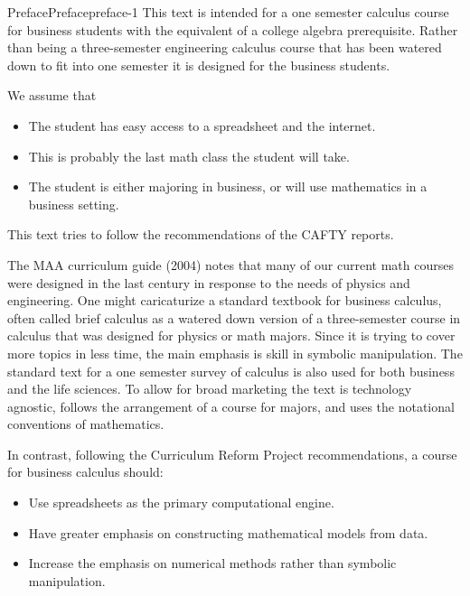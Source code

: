 \documentclass[oneside,10pt,]{book}
\numberwithin{equation}{section}
\begin{document}
\begin{preface}{Preface}{}{Preface}{}{}{preface-1}
\hypertarget{p-4}{}%
This text is intended for a one semester calculus course for business students with the equivalent of a college algebra prerequisite.  Rather than being a three-semester engineering calculus course that has been watered down to fit into one semester it is designed for the business students.%
\par
\hypertarget{p-5}{}%
We assume that%
\leavevmode%
\begin{itemize}[label=\textbullet]
\item{}\hypertarget{p-6}{}%
The student has easy access to a spreadsheet and the internet.%
\item{}\hypertarget{p-7}{}%
This is probably the last math class the student will take.%
\item{}\hypertarget{p-8}{}%
The student is either majoring in business, or will use mathematics in a business setting.%
\end{itemize}
\hypertarget{p-9}{}%
This text tries to follow the recommendations of the CAFTY reports.%
\par
\hypertarget{p-10}{}%
The MAA curriculum guide (2004) notes that many of our current math courses were designed in the last century in response to the needs of physics and engineering. One might caricaturize a standard textbook for business calculus, often called brief calculus as a watered down version of a three-semester course in calculus that was designed for physics or math majors. Since it is trying to cover more topics in less time, the main emphasis is skill in symbolic manipulation. The standard text for a one semester survey of calculus is also used for both business and the life sciences. To allow for broad marketing the text is technology agnostic, follows the arrangement of a course for majors, and uses the notational conventions of mathematics.%
\par
\hypertarget{p-11}{}%
In contrast, following the Curriculum Reform Project recommendations, a course for business calculus should:%
\leavevmode%
\begin{itemize}[label=\textbullet]
\item{}\hypertarget{p-12}{}%
Use spreadsheets as the primary computational engine.%
\item{}\hypertarget{p-13}{}%
Have greater emphasis on constructing mathematical models from data.%
\item{}\hypertarget{p-14}{}%
Increase the emphasis on numerical methods rather than symbolic manipulation.%

\end{itemize}
\end{preface}
\end{document}
